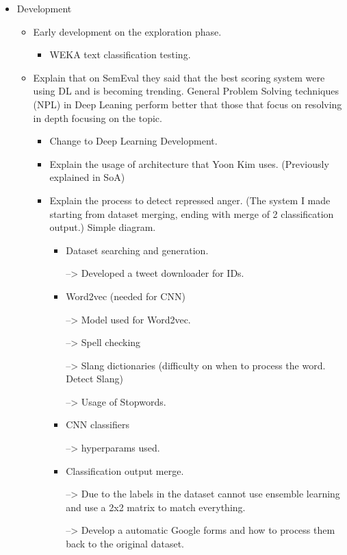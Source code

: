 \begin{itemize}
  \item Development
  \begin{itemize}
    \item Early development on the exploration phase.
    \begin{itemize}
      \item WEKA text classification testing.
    \end{itemize}
    \item Explain that on SemEval they said that the best scoring system were using DL and is becoming trending. General Problem Solving techniques (NPL) in Deep Leaning perform better that those that focus on resolving in depth focusing on the topic.
    \begin{itemize}
      \item Change to Deep Learning Development.
      \item Explain the usage of architecture that Yoon Kim uses. (Previously explained in SoA)
      \item Explain the process to detect repressed anger. (The system I made starting from dataset merging, ending with merge of 2 classification output.) Simple diagram.
      \begin{itemize}
        \item Dataset searching and generation.

          --> Developed a tweet downloader for IDs.

        \item Word2vec (needed for CNN)

          --> Model used for Word2vec.
          
          --> Spell checking
          
          --> Slang dictionaries (difficulty on when to process the word. Detect Slang)
          
          --> Usage of Stopwords.

        \item CNN classifiers

          --> hyperparams used.

        \item Classification output merge.
        
        --> Due to the labels in the dataset cannot use ensemble learning and use a 2x2 matrix to match everything.
        
        --> Develop a automatic Google forms and how to process them back to the original dataset.
      \end{itemize}
    \end{itemize}
  \end{itemize}


\end{itemize}

